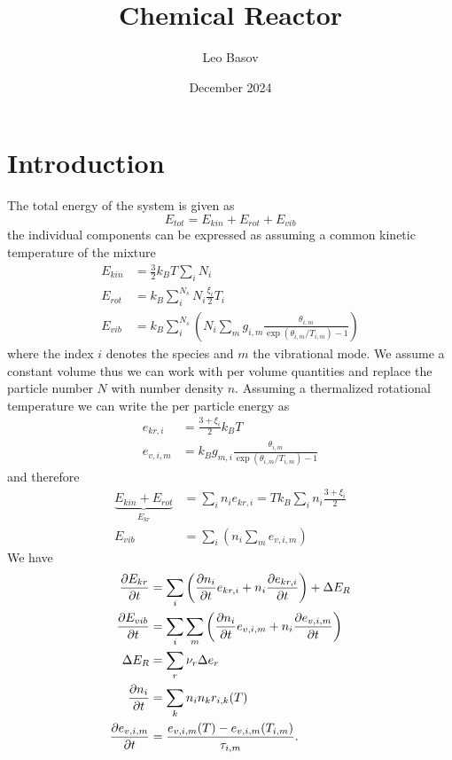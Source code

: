 \documentclass{scrreprt}
\title{Chemical Reactor}
\author{Leo Basov}
\date{December 2024}
\begin{document}
\maketitle

\chapter{Introduction}
The total energy of the system is given as
\begin{equation}
	E_{tot} = E_{kin} + E_{rot} + E_{vib}
\end{equation}
the individual components can be expressed as assuming a common kinetic temperature of the mixture
\begin{align}
	E_{kin} &= \frac{3}{2} k_B T \sum_i N_i\\
	E_{rot} &= k_B \sum_i^{N_s} N_i \frac{\xi_i}{2} T_i\\
	E_{vib} &= k_B \sum_i^{N_s} \left( N_i \sum_m g_{i, m} \frac{\theta_{i, m}}{\exp(\theta_{i, m} / T_{i, m}) - 1} \right)
\end{align}
where the index $i$ denotes the species and $m$ the vibrational mode.
We assume a constant volume thus we can work with per volume quantities and replace the particle number $N$ with number density $n$.
Assuming a thermalized rotational temperature we can write the per particle energy as
\begin{align}
	e_{kr, i} &= \frac{3 + \xi_i}{2} k_B T\\
	e_{v, i, m} &= k_B g_{m, i} \frac{\theta_{i, m}}{\exp(\theta_{i, m} / T_{i, m}) - 1}
\end{align}
and therefore
\begin{align}
	\underbrace{E_{kin} + E_{rot}}_{E_{kr}} &= \sum_i n_i e_{kr, i} = T k_B \sum_i n_i \frac{3 + \xi_i}{2}\\
	E_{vib} &= \sum_i \left( n_i \sum_m e_{v, i, m}\right)
\end{align}
We have
\begin{align}
	\pdv{E_{kr}}{t} &= \sum_i \left( \pdv{n_i}{t} e_{kr, i} + n_i \pdv{e_{kr, i}}{t} \right) + \Delta E_R\\
	\pdv{E_{vib}}{t} &= \sum_i \sum_m \left( \pdv{n_i}{t} e_{v, i, m} + n_i \pdv{e_{v, i, m}}{t} \right)\\
	\Delta E_R &= \sum_r \nu_r \Delta e_r\\
	\frac{\partial n_i}{\partial t} &= \sum_k n_i n_k r_{i, k}(T)\\
	\frac{\partial e_{v, i, m}}{\partial t} &= \frac{e_{v, i, m}(T) - e_{v, i, m}(T_{i,m})}{\tau_{i, m}}.
\end{align}
\end{document}
